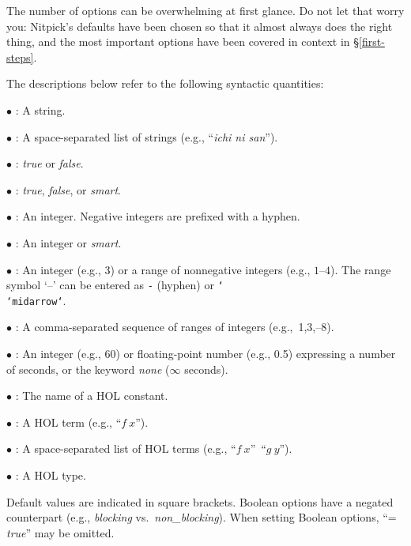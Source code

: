 \documentclass[a4paper,12pt]{article}
\begin{document}
The number of options can be overwhelming at first glance. Do not let that worry
you: Nitpick's defaults have been chosen so that it almost always does the right
thing, and the most important options have been covered in context in
\S\ref{first-steps}.

The descriptions below refer to the following syntactic quantities:

\begin{enum}
\item[$\bullet$] : A string.
\item[$\bullet$] : A space-separated list of strings
(e.g., ``\textit{ichi ni san}'').
\item[$\bullet$] : \textit{true} or \textit{false}.
\item[$\bullet$] : \textit{true}, \textit{false}, or \textit{smart}.
\item[$\bullet$] : An integer. Negative integers are prefixed with a hyphen.
\item[$\bullet$] : An integer or \textit{smart}.
\item[$\bullet$] : An integer (e.g., 3) or a range
of nonnegative integers (e.g., $1$--$4$). The range symbol `--' can be entered as \texttt{-} (hyphen) or \texttt{\char`\\\char`\<midarrow\char`\>}.
\item[$\bullet$] : A comma-separated sequence of ranges of integers (e.g.,~1{,}3{,}--8).
\item[$\bullet$] : An integer (e.g., 60) or floating-point number
(e.g., 0.5) expressing a number of seconds, or the keyword \textit{none}
($\infty$ seconds).
\item[$\bullet$] : The name of a HOL constant.
\item[$\bullet$] : A HOL term (e.g., ``$f~x$'').
\item[$\bullet$] : A space-separated list of HOL terms (e.g.,
``$f~x$''~``$g~y$'').
\item[$\bullet$] : A HOL type.
\end{enum}

Default values are indicated in square brackets. Boolean options have a negated
counterpart (e.g., \textit{blocking} vs.\ \textit{non\_blocking}). When setting
Boolean options, ``= \textit{true}'' may be omitted.
\end{document}
